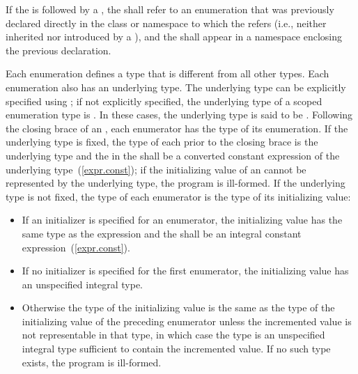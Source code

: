 \pnum
If the  is followed by a
, the  shall
refer to an enumeration that was previously declared directly in the class or
namespace to which the  refers (i.e., neither
inherited nor introduced by a ), and the
 shall appear in a namespace enclosing the previous
declaration.

\pnum
{}%
%
Each enumeration defines a type that is different from all other types.
Each enumeration also has an underlying type.
The underlying type can be explicitly specified using ;
if not explicitly specified, the underlying type of a scoped enumeration type
is . In these cases, the underlying type is said to be
.
Following the closing brace of an , each
enumerator has the type of its enumeration.
If the underlying type is fixed, the type of each 
prior to the closing brace is the underlying
type
and the  in the 
shall be a converted constant expression of the underlying type~(\ref{expr.const});
if the initializing value of an  cannot be represented
by the underlying type, the program is ill-formed. If the underlying
type is not fixed,
the type of each enumerator is the type of its initializing value:

\begin{itemize}
\item If an
initializer is specified for an enumerator, the initializing value has
the same type as the expression and the  shall
be an integral constant expression~(\ref{expr.const}).

\item If no initializer is specified for the
first enumerator, the initializing value has an unspecified integral type.

\item  Otherwise
the type of the initializing value is the same as the type of the initializing value of the
preceding enumerator unless the incremented value is not representable
in that type, in which case the type is an unspecified integral type
sufficient to contain the incremented value. If no such type exists, the program
is ill-formed.
\end{itemize}

